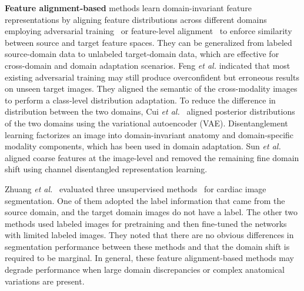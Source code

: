 \documentclass[preprint,12pt]{elsarticle}
\begin{document}
%
\textbf{Feature alignment-based} methods learn domain-invariant feature representations by aligning feature distributions across different domains employing adversarial training~\cite{zheng2025unsupervised,sun2022rethinking,zhang2023st,wang2022unsupervised} or feature-level alignment~\cite{feng2023unsupervised} to enforce similarity between source and target feature spaces. They can be generalized from labeled source-domain data to unlabeled target-domain data, which are effective for cross-domain and domain adaptation scenarios.
%
Feng \textit{et al.} indicated that most existing adversarial training may still produce overconfident but erroneous results on unseen target images. They aligned the semantic of the cross-modality images to perform a class-level distribution adaptation.
%
To reduce the difference in distribution between the two domains, Cui \textit{et al.}~\cite{cui2024toward} aligned posterior distributions of the two domains using the variational autoencoder (VAE).
%
Disentanglement learning factorizes an image into domain-invariant anatomy and domain-specific modality components, which has been used in domain adaptation.
Sun \textit{et al.}~\cite{sun2022attention} aligned coarse features at the image-level and removed the remaining fine domain shift using channel disentangled representation learning.  
 

Zhuang \textit{et al.}~\cite{zhuang2022cardiac} evaluated three unsupervised methods~\cite{chen2019unsupervised,wang2019multi,ly2019style} for cardiac image segmentation. One of them adopted the label information that came from the source domain, and the target domain images do not have a label. 
The other two methods used labeled images for pretraining and then fine-tuned the networks with limited labeled images. 
They noted that there are no obvious differences in segmentation performance between these methods and that the domain shift is required to be marginal.
%
In general, these feature alignment-based methods may degrade performance when large domain discrepancies or complex anatomical variations are present.
\end{document}
